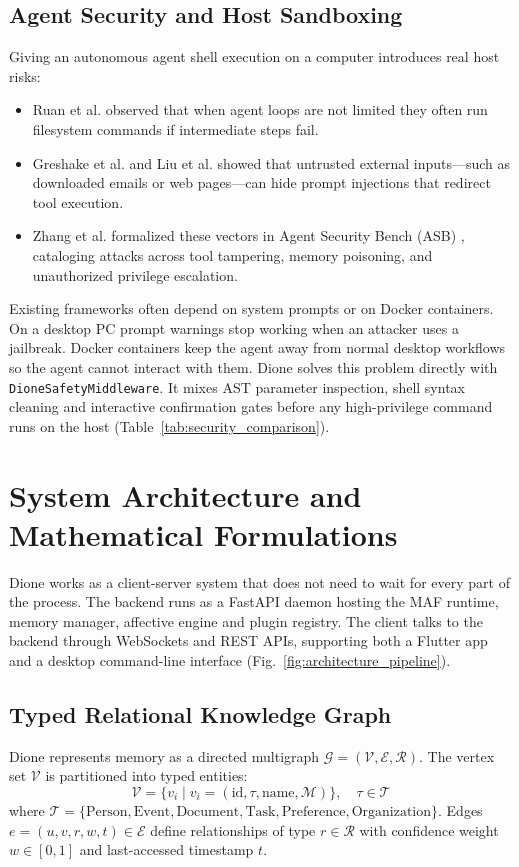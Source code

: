\documentclass[conference,a4paper]{IEEEtran}
\begin{document}
\subsection{Agent Security and Host Sandboxing}
Giving an autonomous agent shell execution on a computer introduces real host risks:
\begin{itemize}
    \item Ruan et al. \cite{ruan2023identifying} observed that when agent loops are not limited they often run filesystem commands if intermediate steps fail.
    \item Greshake et al. \cite{greshake2023not} and Liu et al. \cite{liu2023prompt} showed that untrusted external inputs---such as downloaded emails or web pages---can hide prompt injections that redirect tool execution.
    \item Zhang et al. formalized these vectors in Agent Security Bench (ASB) \cite{zhang2024agent}, cataloging attacks across tool tampering, memory poisoning, and unauthorized privilege escalation.
\end{itemize}

Existing frameworks often depend on system prompts or on Docker containers. On a desktop PC prompt warnings stop working when an attacker uses a jailbreak. Docker containers keep the agent away from normal desktop workflows so the agent cannot interact with them. Dione solves this problem directly with \texttt{DioneSafetyMiddleware}. It mixes AST parameter inspection, shell syntax cleaning and interactive confirmation gates before any high-privilege command runs on the host (Table~\ref{tab:security_comparison}).

\section{System Architecture and Mathematical Formulations}

Dione works as a client-server system that does not need to wait for every part of the process. The backend runs as a FastAPI daemon hosting the MAF runtime, memory manager, affective engine and plugin registry. The client talks to the backend through WebSockets and REST APIs, supporting both a Flutter app and a desktop command-line interface (Fig.~\ref{fig:architecture_pipeline}).

\subsection{Typed Relational Knowledge Graph}
Dione represents memory as a directed multigraph $\mathcal{G} = (\mathcal{V}, \mathcal{E}, \mathcal{R})$. The vertex set $\mathcal{V}$ is partitioned into typed entities:
\begin{equation}
\mathcal{V} = \{v_i \mid v_i = (\text{id}, \tau, \text{name}, \mathcal{M})\}, \quad \tau \in \mathcal{T}
\end{equation}
where $\mathcal{T} = \{\text{Person}, \text{Event}, \text{Document}, \text{Task}, \text{Preference}, \text{Organization}\}$. Edges $e = (u, v, r, w, t) \in \mathcal{E}$ define relationships of type $r \in \mathcal{R}$ with confidence weight $w \in [0, 1]$ and last-accessed timestamp $t$.
\end{document}
